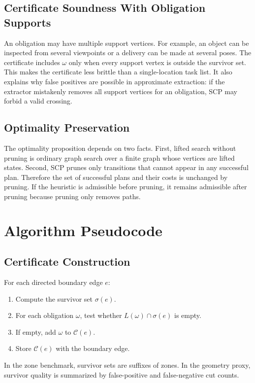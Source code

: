 \documentclass{article}
\newcommand{\cert}{\mathcal{C}}
\newcommand{\survive}{\sigma}
\begin{document}
\subsection{Certificate Soundness With Obligation Supports}

An obligation may have multiple support vertices. For example, an object can be inspected from several viewpoints or a delivery can be made at several poses. The certificate includes $\omega$ only when every support vertex is outside the survivor set. This makes the certificate less brittle than a single-location task list. It also explains why false positives are possible in approximate extraction: if the extractor mistakenly removes all support vertices for an obligation, SCP may forbid a valid crossing.

\subsection{Optimality Preservation}

The optimality proposition depends on two facts. First, lifted search without pruning is ordinary graph search over a finite graph whose vertices are lifted states. Second, SCP prunes only transitions that cannot appear in any successful plan. Therefore the set of successful plans and their costs is unchanged by pruning. If the heuristic is admissible before pruning, it remains admissible after pruning because pruning only removes paths.

\section{Algorithm Pseudocode}

\subsection{Certificate Construction}

For each directed boundary edge $e$:
\begin{enumerate}
  \item Compute the survivor set $\survive(e)$.
  \item For each obligation $\omega$, test whether $L(\omega)\cap\survive(e)$ is empty.
  \item If empty, add $\omega$ to $\cert(e)$.
  \item Store $\cert(e)$ with the boundary edge.
\end{enumerate}
In the zone benchmark, survivor sets are suffixes of zones. In the geometry proxy, survivor quality is summarized by false-positive and false-negative cut counts.
\end{document}
